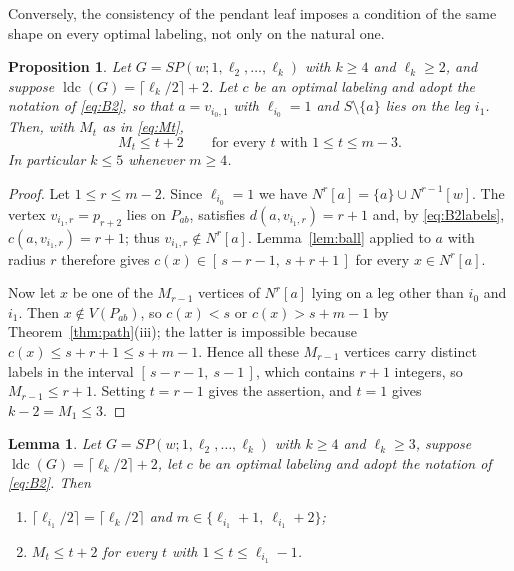 \documentclass[reqno,10pt]{article}
\newtheorem{lemma}[theorem]{Lemma}
\newtheorem{proposition}[theorem]{Proposition}
\theoremstyle{definition}
\numberwithin{equation}{section}
\numberwithin{theorem}{section}
\newcommand{\ldc}{\operatorname{ldc}}
\newcommand{\Ball}[2]{N^{#2}[#1]}
\newcommand{\Ntwo}{M}
\begin{document}
Conversely, the consistency of the pendant leaf imposes a condition of the same
shape on every optimal labeling, not only on the natural one.

\begin{proposition}
\label{prop:excnecessary}
Let $G=SP(w;1,\ell_2,\dots,\ell_k)$ with $k\ge4$ and $\ell_k\ge2$, and suppose
$\ldc(G)=\lceil \ell_k/2\rceil+2$. Let $c$ be an optimal labeling and adopt the
notation of \eqref{eq:B2}, so that $a=v_{i_0,1}$ with $\ell_{i_0}=1$ and
$S\setminus\{a\}$ lies on the leg $i_1$. Then, with $\Ntwo_t$ as in
\eqref{eq:Mt},
\[
  \Ntwo_t\le t+2\qquad\text{for every } t \text{ with } 1\le t\le m-3 .
\]
In particular $k\le5$ whenever $m\ge4$.
\end{proposition}

\begin{proof}
Let $1\le r\le m-2$. Since $\ell_{i_0}=1$ we have
$\Ball{a}{r}=\{a\}\cup\Ball{w}{r-1}$. The vertex $v_{i_1,r}=p_{r+2}$ lies on
$P_{ab}$, satisfies $d(a,v_{i_1,r})=r+1$ and, by \eqref{eq:B2labels},
$c(a,v_{i_1,r})=r+1$; thus $v_{i_1,r}\notin\Ball{a}{r}$. Lemma~\ref{lem:ball}
applied to $a$ with radius $r$ therefore gives $c(x)\in[\,s-r-1,\ s+r+1\,]$ for
every $x\in\Ball{a}{r}$.

Now let $x$ be one of the $\Ntwo_{r-1}$ vertices of $\Ball{a}{r}$ lying on a leg
other than $i_0$ and $i_1$. Then $x\notin V(P_{ab})$, so $c(x)<s$ or
$c(x)>s+m-1$ by Theorem~\ref{thm:path}(iii); the latter is impossible because
$c(x)\le s+r+1\le s+m-1$. Hence all these $\Ntwo_{r-1}$ vertices carry distinct
labels in the interval $[\,s-r-1,\ s-1\,]$, which contains $r+1$ integers, so
$\Ntwo_{r-1}\le r+1$. Setting $t=r-1$ gives the assertion, and $t=1$ gives
$k-2=\Ntwo_1\le3$.
\end{proof}

\begin{lemma}
\label{lem:excrange}
Let $G=SP(w;1,\ell_2,\dots,\ell_k)$ with $k\ge4$ and $\ell_k\ge3$, suppose
$\ldc(G)=\lceil \ell_k/2\rceil+2$, let $c$ be an optimal labeling and adopt the
notation of \eqref{eq:B2}. Then
\begin{enumerate}
\item[\textup{(i)}] $\lceil \ell_{i_1}/2\rceil=\lceil \ell_k/2\rceil$ and
$m\in\{\ell_{i_1}+1,\ \ell_{i_1}+2\}$;
\item[\textup{(ii)}] $\Ntwo_t\le t+2$ for every $t$ with $1\le t\le \ell_{i_1}-1$.
\end{enumerate}
\end{lemma}
\end{document}
